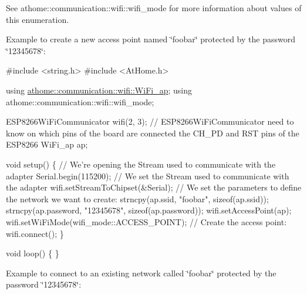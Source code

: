 See athome\+::communication\+::wifi\+::wifi\+\_\+mode for more information about values of this enumeration.

Example to create a new access point named \char`\"{}foobar\char`\"{} protected by the password \char`\"{}12345678\char`\"{}\+:


\begin{DoxyCode}
\textcolor{preprocessor}{#include <string.h>}
\textcolor{preprocessor}{#include <AtHome.h>}

\textcolor{keyword}{using} \mbox{\hyperlink{structathome_1_1communication_1_1wifi_1_1s__wifi__access__point}{athome::communication::wifi::WiFi\_ap}};
\textcolor{keyword}{using} athome::communication::wifi::wifi\_mode;

ESP8266WiFiCommunicator wifi(2, 3); \textcolor{comment}{// ESP8266WiFiCommunicator need to know on which pins of the board are
       connected the CH\_PD and RST pins of the ESP8266}
WiFi\_ap ap;

\textcolor{keywordtype}{void} setup() \{
  \textcolor{comment}{// We're opening the Stream used to communicate with the adapter}
  Serial.begin(115200);
  \textcolor{comment}{// We set the Stream used to communicate with the adapter}
  wifi.setStreamToChipset(&Serial);
  \textcolor{comment}{// We set the parameters to define the network we want to create:}
  strncpy(ap.ssid, \textcolor{stringliteral}{"foobar"}, \textcolor{keyword}{sizeof}(ap.ssid));
  strncpy(ap.password, \textcolor{stringliteral}{"12345678"}, \textcolor{keyword}{sizeof}(ap.password));
  wifi.setAccessPoint(ap);
  wifi.setWiFiMode(wifi\_mode::ACCESS\_POINT);
  \textcolor{comment}{// Create the access point:}
  wifi.connect();
\}

\textcolor{keywordtype}{void} loop() \{
\}
\end{DoxyCode}


Example to connect to an existing network called \char`\"{}foobar\char`\"{} protected by the password \char`\"{}12345678\char`\"{}\+:


